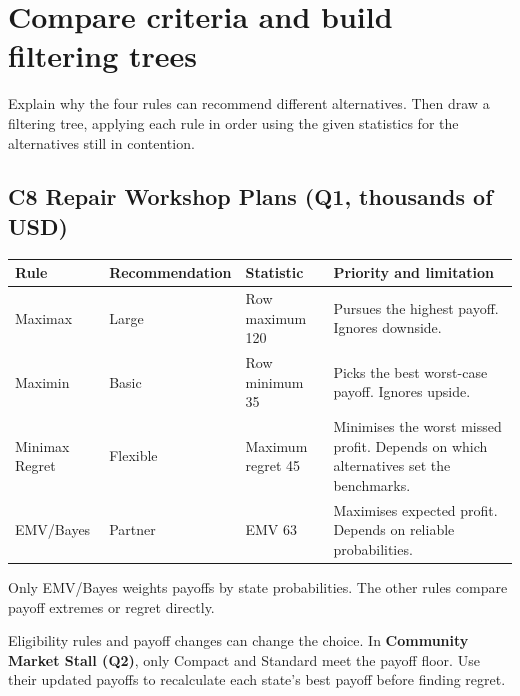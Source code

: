 \begin{criteria}
\end{criteria}

\clearpage
\section{Compare criteria and build filtering trees}
Explain why the four rules can recommend different alternatives. Then draw a filtering tree, applying each rule in order using the given statistics for the alternatives still in contention.

\subsection*{C8 \textemdash{} Repair Workshop Plans (Q1, thousands of USD)}
{\small
\begin{tabularx}{\linewidth}{@{}lllL@{}}
\toprule
Rule & Recommendation & Statistic & Priority and limitation\\
\midrule
Maximax & Large & Row maximum 120 & Pursues the highest payoff. Ignores downside.\\
Maximin & Basic & Row minimum 35 & Picks the best worst-case payoff. Ignores upside.\\
Minimax Regret & Flexible & Maximum regret 45 & Minimises the worst missed profit. Depends on which alternatives set the benchmarks.\\
EMV/Bayes & Partner & EMV 63 & Maximises expected profit. Depends on reliable probabilities.\\
\bottomrule
\end{tabularx}\par}
Only EMV/Bayes weights payoffs by state probabilities. The other rules compare payoff extremes or regret directly.

Eligibility rules and payoff changes can change the choice. In \textbf{Community Market Stall (Q2)}, only Compact and Standard meet the payoff floor. Use their updated payoffs to recalculate each state's best payoff before finding regret.

